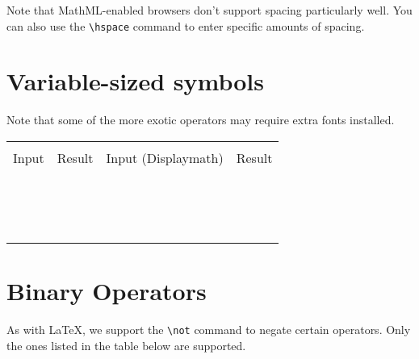 Note that MathML-enabled browsers don't support spacing particularly well.
You can also use the \verb|\hspace| command to enter specific amounts of spacing.

\begin{demotable}
\end{demotable}

\section*{Variable-sized symbols}

Note that some of the more exotic operators may require extra fonts installed.

\newcommand{\dmdemo}[1]{\minout{#1} & \dminout{#1} \\}
\newcommand{\vdemo}[1]{\dmdemo{#1_a^b A_{\lambda}}}

\newenvironment{dmdemotable}
{\begin{center}
 \begin{tabular}{|r|l|r|l|}
 \hline \\
 Input & Result & Input (Displaymath) & Result \\
 \hline \\
}{\hline
 \end{tabular}
 \end{center}
}

\begin{dmdemotable}
\vdemo{\sum}
\vdemo{\prod}
\vdemo{\coprod}
\vdemo{\int}
\vdemo{\oint}
\vdemo{\bigcap}
\vdemo{\bigcup}
\vdemo{\bigsqcup}
\vdemo{\bigvee}
\vdemo{\bigwedge}
\vdemo{\bigodot}
\vdemo{\bigotimes}
\vdemo{\bigoplus}
\vdemo{\biguplus}
\end{dmdemotable}

\section*{Binary Operators}

As with LaTeX, we support the \verb|\not| command to negate certain operators. Only
the ones listed in the table below are supported.


\newcommand{\rdemo}[1]{\minout{#1} & & \\}
\newcommand{\rndemo}[1]{\minout{#1} & \minout{\not #1} \\}
\newenvironment{rdemotable}
{\begin{center}
 \begin{tabular}{|r|l|r|l|}
 \hline \\
 Input & Result & Input (notted) & Result \\
 \hline \\
}{\hline
 \end{tabular}
 \end{center}
}

